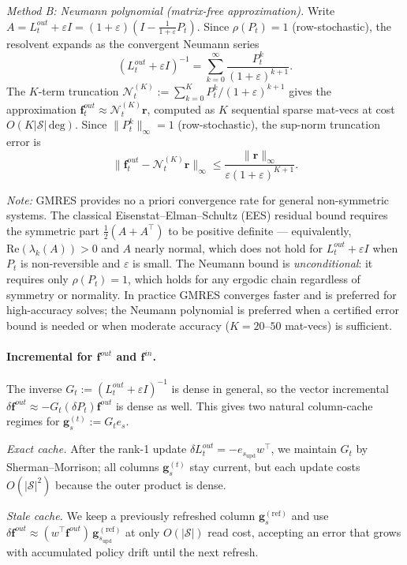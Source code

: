 \documentclass[10pt,a4paper]{article}
\begin{document}
\emph{Method B: Neumann polynomial (matrix-free approximation).}
Write $A = L^{out}_t + \varepsilon I = (1+\varepsilon)(I - \frac{1}{1+\varepsilon} P_t)$.
Since $\rho(P_t) = 1$ (row-stochastic), the resolvent expands as the convergent Neumann series
\[
  (L^{out}_t + \varepsilon I)^{-1}
  = \sum_{k=0}^{\infty}\frac{P_t^k}{(1+\varepsilon)^{k+1}}.
\]
The $K$-term truncation $\mathcal{N}^{(K)}_t \!:= \sum_{k=0}^{K} P_t^k/(1+\varepsilon)^{k+1}$
gives the approximation $\mathbf{f}^{out}_t \approx \mathcal{N}^{(K)}_t\mathbf{r}$,
computed as $K$ sequential sparse mat-vecs at cost $O(K|\mathcal{S}|\,\mathrm{deg})$.
Since $\|P_t^k\|_\infty = 1$ (row-stochastic), the sup-norm truncation error is
\[
  \bigl\|\mathbf{f}^{out}_t - \mathcal{N}^{(K)}_t\mathbf{r}\bigr\|_\infty
  \leq \frac{\|\mathbf{r}\|_\infty}{\varepsilon(1+\varepsilon)^{K+1}}.
\]

\textit{Note:} GMRES provides no a priori convergence rate for general non-symmetric systems.
The classical Eisenstat--Elman--Schultz (EES) residual bound requires the symmetric
part $\tfrac{1}{2}(A+A^\top)$ to be positive definite --- equivalently,
$\mathrm{Re}(\lambda_k(A)) > 0$ and $A$ nearly normal, which does not hold for $L^{out}_t + \varepsilon I$
when $P_t$ is non-reversible and $\varepsilon$ is small.
The Neumann bound is \emph{unconditional}: it requires only $\rho(P_t)=1$, which holds
for any ergodic chain regardless of symmetry or normality.
In practice GMRES converges faster and is preferred for high-accuracy solves;
the Neumann polynomial is preferred when a certified error bound is needed or when
moderate accuracy ($K = 20$--$50$ mat-vecs) is sufficient.


\paragraph{Incremental for $\mathbf{f}^{out}$ and $\mathbf{f}^{in}$.}
The inverse $G_t := (L^{out}_t+\varepsilon I)^{-1}$ is dense in general, so the vector incremental
$\delta\mathbf{f}^{out} \approx -G_t(\delta P_t)\mathbf{f}^{out}$ is dense as well.
This gives two natural column-cache regimes for $\mathbf{g}^{(t)}_s := G_t e_s$.

\emph{Exact cache.} After the rank-1 update $\delta L^{out}_t = -e_{s_{\mathrm{upd}}}w^\top$,
we maintain $G_t$ by Sherman--Morrison; all columns $\mathbf{g}^{(t)}_s$ stay current, but each update
costs $O(|\mathcal{S}|^2)$ because the outer product is dense.

\emph{Stale cache.} We keep a previously refreshed column $\mathbf{g}_{s}^{(\mathrm{ref})}$ and use
$\delta\mathbf{f}^{out} \approx (w^\top\mathbf{f}^{out})\,\mathbf{g}_{s_{\mathrm{upd}}}^{(\mathrm{ref})}$ at only
$O(|\mathcal{S}|)$ read cost, accepting an error that grows with accumulated policy drift until the next refresh.
\end{document}
